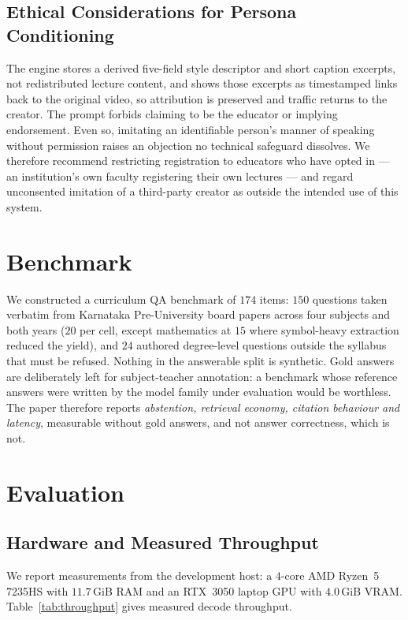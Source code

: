 \documentclass[conference]{IEEEtran}
\begin{document}
\subsection{Ethical Considerations for Persona Conditioning}
\label{sec:ethics}
The engine stores a derived five-field style descriptor and short caption
excerpts, not redistributed lecture content, and shows those excerpts as
timestamped links back to the original video, so attribution is preserved and
traffic returns to the creator. The prompt forbids claiming to be the educator
or implying endorsement. Even so, imitating an identifiable person's manner of
speaking without permission raises an objection no technical safeguard
dissolves. We therefore recommend restricting registration to educators who have
opted in --- an institution's own faculty registering their own lectures --- and
regard unconsented imitation of a third-party creator as outside the intended
use of this system.

\section{Benchmark}
We constructed a curriculum QA benchmark of $174$ items: $150$ questions taken
verbatim from Karnataka Pre-University board papers across four subjects and
both years ($20$ per cell, except mathematics at $15$ where symbol-heavy
extraction reduced the yield), and $24$ authored degree-level questions outside
the syllabus that must be refused. Nothing in the answerable split is synthetic.
Gold answers are deliberately left for subject-teacher annotation: a benchmark
whose reference answers were written by the model family under evaluation would
be worthless. The paper therefore reports \emph{abstention, retrieval economy,
citation behaviour and latency}, measurable without gold answers, and not
answer correctness, which is not.

\section{Evaluation}
\subsection{Hardware and Measured Throughput}
\label{sec:latency}
We report measurements from the development host: a $4$-core AMD Ryzen~5 7235HS
with $11.7$\,GiB RAM and an RTX~3050 laptop GPU with $4.0$\,GiB VRAM.
Table~\ref{tab:throughput} gives measured decode throughput.
\end{document}
